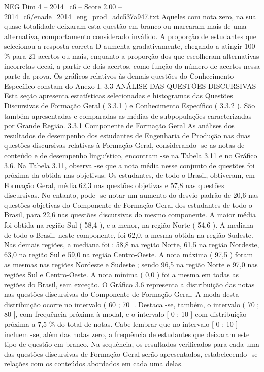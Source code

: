 \begin{textsample}{NEG Dim 4 – 2014\_c6 – Score 2.00 – 2014\_c6/enade\_2014\_eng\_prod\_adc537a947.txt}
Aqueles com nota zero, na sua quase totalidade deixaram esta questão em branco ou marcaram mais de uma alternativa, comportamento considerado inválido.
A proporção de estudantes que selecionou a resposta correta D aumenta gradativamente, chegando a atingir 100 \% para 21 acertos ou mais, enquanto a proporção dos que escolheram alternativas incorretas decai, a partir de dois acertos, como função do número de acertos nessa parte da prova.
Os gráficos relativos às demais questões do Conhecimento Específico constam do Anexo I. 3.3 ANÁLISE DAS QUESTÕES DISCURSIVAS Esta seção apresenta estatísticas selecionadas e histogramas das Questões Discursivas de Formação Geral ( 3.3.1 ) e Conhecimento Específico ( 3.3.2 ).
São também apresentadas e comparadas as médias de subpopulações caracterizadas por Grande Região. 3.3.1 Componente de Formação Geral As análises dos resultados de desempenho dos estudantes de Engenharia de Produção nas duas questões discursivas relativas à Formação Geral, considerando -se as notas de conteúdo e de desempenho linguístico, encontram -se na Tabela 3.11 e no Gráfico 3.6.
Na Tabela 3.11, observa -se que a nota média nesse conjunto de questões foi próxima da obtida nas objetivas.
Os estudantes, de todo o Brasil, obtiveram, em Formação Geral, média 62,3 nas questões objetivas e 57,8 nas questões discursivas.
No entanto, pode -se notar um aumento do desvio padrão de 20,6 nas questões objetivas do Componente de Formação Geral dos estudantes de todo o Brasil, para 22,6 nas questões discursivas do mesmo componente.
A maior média foi obtida na região Sul ( 58,4 ), e a menor, na região Norte ( 54,6 ).
A mediana de todo o Brasil, neste componente, foi 62,0, a mesma obtida na região Sudeste.
Nas demais regiões, a mediana foi : 58,8 na região Norte, 61,5 na região Nordeste, 63,0 na região Sul e 59,0 na região Centro-Oeste.
A nota máxima ( 97,5 ) foram as mesmas nas regiões Nordeste e Sudeste ; sendo 96,5 na região Norte e 97,0 nas regiões Sul e Centro-Oeste.
A nota mínima ( 0,0 ) foi a mesma em todas as regiões do Brasil, sem exceção.
O Gráfico 3.6 representa a distribuição das notas nas questões discursivas do Componente de Formação Geral.
A moda desta distribuição ocorre no intervalo ( 60 ; 70 ].
Destaca -se, também, o intervalo ( 70 ; 80 ], com frequência próxima à modal, e o intervalo [ 0 ; 10 ] com distribuição próxima a 7,5 \% do total de notas.
Cabe lembrar que no intervalo [ 0 ; 10 ] incluem -se, além das notas zero, a frequência de estudantes que deixaram este tipo de questão em branco.
Na sequência, os resultados verificados para cada uma das questões discursivas de Formação Geral serão apresentados, estabelecendo -se relações com os conteúdos abordados em cada uma delas.

\end{textsample}
